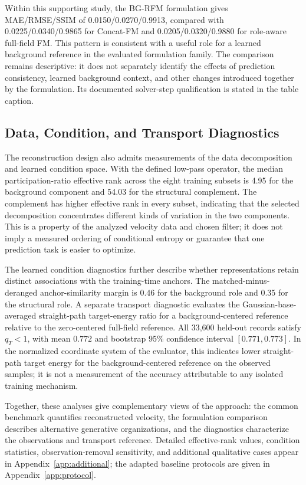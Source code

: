 

Within this supporting study, the BG-RFM formulation gives MAE/RMSE/SSIM of 0.0150/0.0270/0.9913, compared with 0.0225/0.0340/0.9865 for Concat-FM and 0.0205/0.0320/0.9880 for role-aware full-field FM. This pattern is consistent with a useful role for a learned background reference in the evaluated formulation family. The comparison remains descriptive: it does not separately identify the effects of prediction consistency, learned background context, and other changes introduced together by the formulation. Its documented solver-step qualification is stated in the table caption.

\subsection{Data, Condition, and Transport Diagnostics}

The reconstruction design also admits measurements of the data decomposition and learned condition space. With the defined low-pass operator, the median participation-ratio effective rank across the eight training subsets is 4.95 for the background component and 54.03 for the structural complement. The complement has higher effective rank in every subset, indicating that the selected decomposition concentrates different kinds of variation in the two components. This is a property of the analyzed velocity data and chosen filter; it does not imply a measured ordering of conditional entropy or guarantee that one prediction task is easier to optimize.

The learned condition diagnostics further describe whether representations retain distinct associations with the training-time anchors. The matched-minus-deranged anchor-similarity margin is 0.46 for the background role and 0.35 for the structural role. A separate transport diagnostic evaluates the Gaussian-base-averaged straight-path target-energy ratio for a background-centered reference relative to the zero-centered full-field reference. All 33,600 held-out records satisfy $q_T<1$, with mean $0.772$ and bootstrap 95\% confidence interval $[0.771,0.773]$. In the normalized coordinate system of the evaluator, this indicates lower straight-path target energy for the background-centered reference on the observed samples; it is not a measurement of the accuracy attributable to any isolated training mechanism.




Together, these analyses give complementary views of the approach: the common benchmark quantifies reconstructed velocity, the formulation comparison describes alternative generative organizations, and the diagnostics characterize the observations and transport reference. Detailed effective-rank values, condition statistics, observation-removal sensitivity, and additional qualitative cases appear in Appendix~\ref{app:additional}; the adapted baseline protocols are given in Appendix~\ref{app:protocol}.

